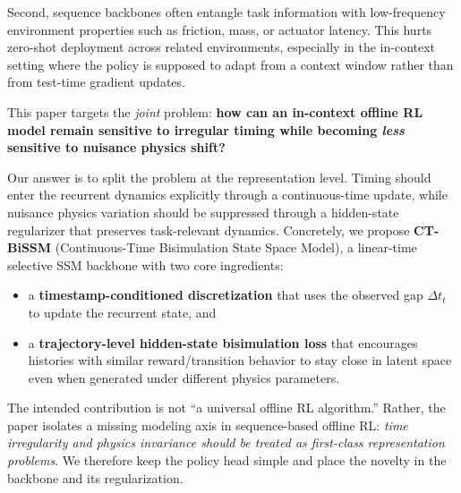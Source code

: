 \documentclass[11pt]{article}
\newcommand{\dt}{\Delta t}
\begin{document}
Second, sequence backbones often entangle task information with low-frequency environment properties such as friction, mass, or actuator latency. This hurts zero-shot deployment across related environments, especially in the in-context setting where the policy is supposed to adapt from a context window rather than from test-time gradient updates.

This paper targets the \emph{joint} problem: \textbf{how can an in-context offline RL model remain sensitive to irregular timing while becoming \emph{less} sensitive to nuisance physics shift?}

Our answer is to split the problem at the representation level. Timing should enter the recurrent dynamics explicitly through a continuous-time update, while nuisance physics variation should be suppressed through a hidden-state regularizer that preserves task-relevant dynamics. Concretely, we propose \textbf{CT-BiSSM} (Continuous-Time Bisimulation State Space Model), a linear-time selective SSM backbone with two core ingredients:
\begin{itemize}
    \item a \textbf{timestamp-conditioned discretization} that uses the observed gap $\dt_t$ to update the recurrent state, and
    \item a \textbf{trajectory-level hidden-state bisimulation loss} that encourages histories with similar reward/transition behavior to stay close in latent space even when generated under different physics parameters.
\end{itemize}

The intended contribution is not ``a universal offline RL algorithm.'' Rather, the paper isolates a missing modeling axis in sequence-based offline RL: \emph{time irregularity and physics invariance should be treated as first-class representation problems}. We therefore keep the policy head simple and place the novelty in the backbone and its regularization.
\end{document}
